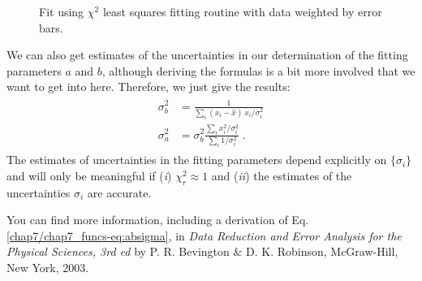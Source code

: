 \documentclass[letterpaper,10pt,english]{sphinxmanual}
\begin{document}
\begin{figure}[htbp]
\centering
\capstart

\caption{Fit using \(\chi^2\) least squares fitting routine with data weighted by error bars.}\label{chap7/chap7_funcs:fig-linregerrbars}\end{figure}

We can also get estimates of the uncertainties in our determination of the fitting parameters \(a\) and \(b\), although deriving the formulas is a bit more involved that we want to get into here.  Therefore, we just give the results:
\label{chap7/chap7_funcs:equation-eq:absigma}\begin{gather}
\begin{split}\sigma_{b}^2 &= \frac{1} {\sum_{i}(x_{i} - \hat{x})\,x_{i}/\sigma_{i}^2}\\
\sigma_{a}^2 &= \sigma_{b}^2 \frac{\sum_{i}x_{i}^2/\sigma_{i}^2} {\sum_{i}1/\sigma_{i}^2}\;.\end{split}\label{chap7/chap7_funcs-eq:absigma}
\end{gather}
The estimates of uncertainties in the fitting parameters depend explicitly on \(\{\sigma_{i}\}\) and will only be meaningful if (\emph{i}) \(\chi_{r}^2 \approx 1\) and (\emph{ii}) the estimates of the uncertainties \(\sigma_{i}\) are accurate.

You can find more information, including a derivation of Eq. \eqref{chap7/chap7_funcs-eq:absigma}, in \emph{Data Reduction and Error Analysis for the Physical Sciences, 3rd ed} by P. R. Bevington \& D. K. Robinson, McGraw-Hill, New York, 2003.
\end{document}
